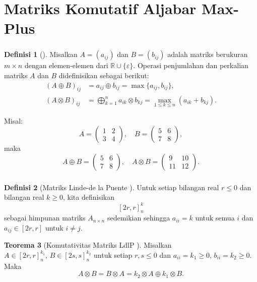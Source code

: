 \documentclass[aspectratio=169]{beamer}
\theoremstyle{definition}
\newtheorem{definisi}{Definisi}
\numberwithin{definisi}{section}
\newtheorem{teorema}[definisi]{Teorema}
\newcommand{\R}{\mathbb{R}}
\begin{document}
\section{Matriks Komutatif Aljabar Max-Plus}
\begin{frame}
  \frametitle{\insertsection}
  \begin{definisi}[\cite{subiono2015minmaxplus}]
    Misalkan $A = (a_{ij})$ dan $B = (b_{ij})$ adalah matriks berukuran $m \times n$ dengan elemen-elemen dari $\R \cup \{\varepsilon\}$. Operasi penjumlahan dan perkalian matriks $A$ dan $B$ didefinisikan sebagai berikut:
    \begin{align*}
      (A \oplus B)_{ij}  & = a_{ij} \oplus b_{ij} = \max\{a_{ij}, b_{ij}\},                                        \\
      (A \otimes B)_{ij} & = \bigoplus_{k=1}^{n} a_{ik} \otimes b_{kj} = \max_{1 \leq k \leq n} (a_{ik} + b_{kj}).
    \end{align*}
  \end{definisi}
  {Misal:
  \[
    A = \begin{pmatrix}
      1 & 2 \\
      3 & 4
    \end{pmatrix}, \quad
    B = \begin{pmatrix}
      5 & 6 \\
      7 & 8
    \end{pmatrix},
  \]
  maka
  \[
    A \oplus B = \begin{pmatrix}
      5 & 6 \\
      7 & 8
    \end{pmatrix}, \quad
    A \otimes B = \begin{pmatrix}
      9  & 10 \\
      11 & 12
    \end{pmatrix}.
  \]}
\end{frame}
\begin{frame}
  \frametitle{\insertsection}
  \begin{definisi}[Matriks Linde-de la Puente {\cite{linde2014matricescommutinggivennormal}}]
    Untuk setiap bilangan real $r \leq 0$ dan bilangan real $k \geq 0$, kita definisikan
    \[
      [2r, r]_{n}^{k}
    \]
    sebagai himpunan matriks $A_{n\times n}$ sedemikian sehingga $a_{ii} = k$ untuk semua $i$ dan $a_{ij} \in [2r, r]$ untuk $i \neq j$.
  \end{definisi}

  \begin{teorema}[Komutativitas Matriks LdlP \cite{linde2014matricescommutinggivennormal}]
    Misalkan $A \in [2r, r]_{n}^{k_{1}}, \, B \in [2s, s]_{n}^{k_{2}}$ untuk setiap $r, s \leq 0$ dan $a_{ii} = k_{1} \geq 0, \, b_{ii} = k_{2} \geq 0$. Maka
    \[
      A \otimes B = B \otimes A = k_{2} \otimes A \oplus k_{1} \otimes B.
    \]
  \end{teorema}
\end{frame}
\end{document}
